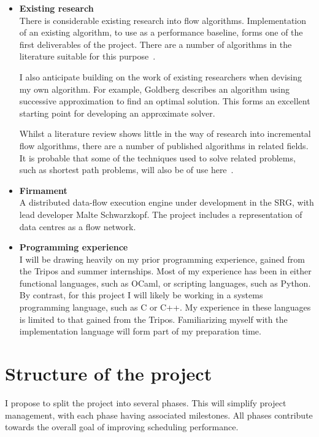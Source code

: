 \begin{itemize}
  \item \textbf{Existing research} \\
    There is considerable existing research into flow algorithms. Implementation of an existing algorithm, to use as a performance baseline, forms one of the first deliverables of the project. There are a number of algorithms in the literature suitable for this purpose~\cite{Goldberg:1992,Zolt:2012}.
    
    I also anticipate building on the work of existing researchers when devising my own algorithm. For example, Goldberg\cite{Goldberg:1987} describes an algorithm using successive approximation to find an optimal solution. This forms an excellent starting point for developing an approximate solver.

    Whilst a literature review shows little in the way of research into incremental flow algorithms, there are a number of published algorithms in related fields. It is probable that some of the techniques used to solve related problems, such as shortest path problems, will also be of use here~\cite{Ramalingam:1996,Roddity:2011}.
  \item \textbf{Firmament} \\
    A distributed data-flow execution engine under development in the SRG, with lead developer Malte Schwarzkopf. The project includes a representation of data centres as a flow network.
  \item \textbf{Programming experience} \\ 
    I will be drawing heavily on my prior programming experience, gained from the Tripos and summer internships. Most of my experience has been in either functional languages, such as OCaml, or scripting languages, such as Python. By contrast, for this project I will likely be working in a systems programming language, such as C or C++. My experience in these languages is limited to that gained from the Tripos. Familiarizing myself with the implementation language will form part of my preparation time.
\end{itemize}

\section*{Structure of the project}

I propose to split the project into several phases. This will simplify project management, with each phase having associated milestones. All phases contribute towards the overall goal of improving scheduling performance.

